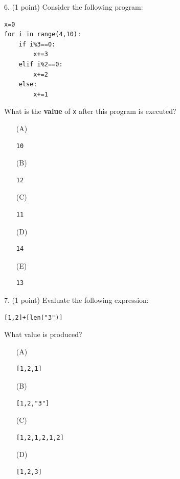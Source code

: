 \documentclass{article}
\begin{document}
\noindent
\begin{minipage}{\textwidth}
6. (1 point)
Consider the following program:
\begin{verbatim}
x=0
for i in range(4,10):
    if i%3==0:
        x+=3
    elif i%2==0:
        x+=2
    else:
        x+=1
\end{verbatim}
What is the \textbf{value} of \texttt{x} after this program is executed?

\begin{enumerate}
\item[(A)]
\begin{verbatim}10\end{verbatim}

\item[(B)]
\begin{verbatim}12\end{verbatim}

\item[(C)]
\begin{verbatim}11\end{verbatim}

\item[(D)]
\begin{verbatim}14\end{verbatim}

\item[(E)]
\begin{verbatim}13\end{verbatim}

\end{enumerate}
\end{minipage}
\vspace{2em}
\filbreak\vfil{}\vfilneg

\noindent
\begin{minipage}{\textwidth}
7. (1 point)
Evaluate the following expression:
\begin{verbatim}
[1,2]+[len("3")]
\end{verbatim}
What value is produced?

\begin{enumerate}
\item[(A)]
\begin{verbatim}[1,2,1]\end{verbatim}

\item[(B)]
\begin{verbatim}[1,2,"3"]\end{verbatim}

\item[(C)]
\begin{verbatim}[1,2,1,2,1,2]\end{verbatim}

\item[(D)]
\begin{verbatim}[1,2,3]\end{verbatim}

\end{enumerate}
\end{minipage}
\vspace{2em}
\filbreak\vfil{}\vfilneg
\end{document}
